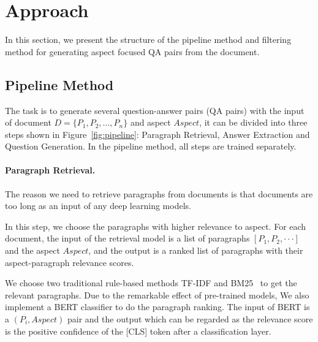 \section{Approach}
\label{sec:method}

In this section, we present the structure of the pipeline method and filtering method for generating aspect focused QA pairs from the document. 

\subsection{Pipeline Method}
\label{sec:pipeline}
The task is to generate several question-answer pairs (QA pairs) with the input of document $D=\{P_1, P_2, ... , P_n\}$ and aspect $Aspect$, it can be divided into three steps shown in Figure~\ref{fig:pipeline}: Paragraph Retrieval, Answer Extraction and Question Generation. In the pipeline method, all steps are trained separately.
\paragraph{Paragraph Retrieval.} The reason we need to retrieve paragraphs from documents is that documents are too long as an input of any deep learning models. 

In this step, we choose the paragraphs with higher relevance to aspect.
For each document, the input of the retrieval model is a list of paragraphs $[P_1, P_2, \cdot\cdot\cdot]$ and the aspect $Aspect$, and the output is a ranked list of paragraphs with their aspect-paragraph relevance scores.

We choose two traditional rule-based methods TF-IDF and BM25~\cite{robertson2009probabilistic} to get the relevant paragraphs.
Due to the remarkable effect of pre-trained models, We also implement a BERT classifier to do the paragraph ranking\cite{qiao2019understanding}.
The input of BERT is a $(P_i, Aspect)$ pair and the output which can be regarded as the relevance score is the positive confidence of the [CLS] token after a classification layer.


